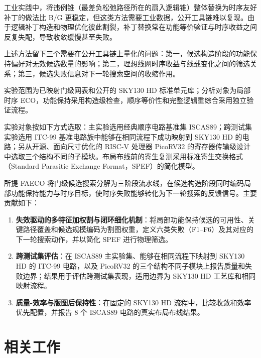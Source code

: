 \documentclass[twocolumn,10pt,fontset=windows]{ctexart}
\begin{document}
工业实践中，将违例锥（最差负松弛路径所在的扇入逻辑锥）整体替换为时序友好补丁的做法比 B/G 更稳定，但这类方法需要工业数据，公开工具链难以复现。由于逻辑补丁构造和物理优化彼此割裂，补丁替换常在功能等价验证与时序收益之间反复失配，导致收敛缓慢甚至失败。

上述方法留下三个需要在公开工具链上量化的问题：第一，候选构造阶段的功能保持偏好对无效候选数量的影响；第二，理想线网时序收益与线载变化之间的筛选关系；第三，候选失败信息对下一轮搜索空间的收缩作用。
\noindent\parbox{\columnwidth}{实验范围为已映射门级网表和公开的 SKY130 HD 标准单元库；分析对象为局部时序 ECO，功能保持采用构造级检查，顺序等价性和完整逻辑重综合采用独立验证流程。}

\begin{samepage}
实验对象按如下方式选取：主实验选用经典顺序电路基准集 ISCAS89\cite{iscas89}；跨测试集实验选用 ITC-99 基准电路族中能够在相同流程下成功映射到 SKY130 HD 的电路\cite{itc99}；另从开源、面向尺寸优化的 RISC-V 处理器 PicoRV32 的寄存器传输级设计中选取三个结构不同的子模块\cite{picorv32}。布局布线前的寄生复测采用标准寄生交换格式（Standard Parasitic Exchange Format，SPEF）的简化模型。
\end{samepage}

所提 FAECO 将门级候选搜索分解为三阶段流水线，在候选构造阶段同时编码局部功能保持能力与时序目标，使时序失败能够转化为下一轮搜索的反馈信号。主要贡献如下：

\begin{enumerate}
  \item \textbf{失效驱动的多特征加权割与闭环细化机制}：将局部功能保持候选的可用性、关键路径覆盖和候选规模编码为割图权重，定义六类失败（F1--F6）及其对应的下一轮搜索动作，并以简化 SPEF 进行物理筛选。
\item \textbf{跨测试集评估}：在 ISCAS89 主实验集、能够在相同流程下映射到 SKY130 HD 的 ITC-99 电路，以及 PicoRV32 的三个结构不同子模块上报告质量和失败边界；结果用于评估跨测试集表现，适用边界为 SKY130 HD 工艺库和相同映射流程。
\item \textbf{质量-效率与版图后保持性}：在固定的 SKY130 HD\cite{sky130} 流程中，比较收敛和效率优先配置，并报告 8 个 ISCAS89 电路的真实布局布线结果。
\end{enumerate}

\section{相关工作}
\end{document}
